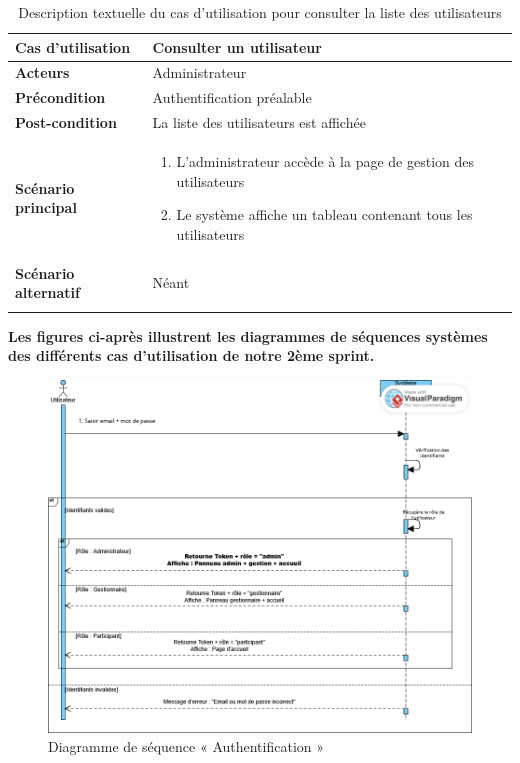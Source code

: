 \begin{longtable}{|>{\bfseries}p{3.5cm}|p{9cm}|}
\hline
Cas d'utilisation & Consulter un utilisateur \\
\hline
Acteurs & Administrateur \\
\hline
Précondition & Authentification préalable \\
\hline
Post-condition & La liste des utilisateurs est affichée \\
\hline
Scénario principal & 
\begin{enumerate}
  \item L'administrateur accède à la page de gestion des utilisateurs
  \item Le système affiche un tableau contenant tous les utilisateurs
\end{enumerate} \\
\hline
Scénario alternatif & Néant \\
\hline
\caption{Description textuelle du cas d'utilisation pour consulter la liste des utilisateurs}
\end{longtable}

\textbf{Les figures ci-après illustrent les diagrammes de séquences systèmes des différents cas d'utilisation de notre 2ème sprint.}

\begin{figure}[H]
    \centering
    \includegraphics[width=1\linewidth]{projet/images/diagramme de sequance/diagrame de sequance s'athentifier.png}
    \caption{Diagramme de séquence « Authentification »}
    \label{fig:diagramme1}
\end{figure}

